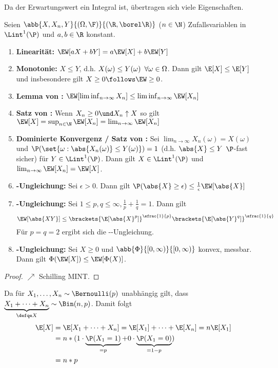 Da der Erwartungswert ein Integral ist, übertragen sich viele Eigenschaften. 
\begin{proposition}
	\label{5_6_proposition}
	Seien $\abb{X,X_n,Y}{(\Omega,\F)}{(\R, \borel\R)}$ ($n \in \N$) Zufallsvariablen in $\Lint^1(\P)$ und $a,b \in \R$ konstant.
	\begin{enumerate}[leftmargin=*]
		\item \textbf{Linearität:} $\EW[aX +bY] = a \EW[X] + b \EW[Y]$
		\item \textbf{Monotonie:} $X \le Y$, d.h. $X(\omega) \le Y(\omega) \enskip \forall \omega \in \Omega$. Dann gilt $\E[X] \le \E[Y]$ und insbesondere gilt $X \ge 0 \follows \EW \ge 0$.
		\item \textbf{Lemma von :} $\EW[\liminf_{n \to \infty}X_n] \le \liminf_{n \to \infty} \EW[X_n]$
		\item \textbf{Satz von :} Wenn $X_n \ge 0 \und X_n \uparrow X$ so gilt $\EW[X] = \sup_{n \in \N} \EW[X_n] = \lim_{n \to \infty} \EW[X_n]$
		\item \textbf{Dominierte Konvergenz / Satz von :} Sei $\lim_{n \to \infty} X_n(\omega) = X(\omega)$ und $\P(\set{\omega: \abs{X_n(\omega)} \le Y(\omega)}) = 1$ (d.h. $\abs{X} \le Y$ $\P$-fast sicher) für $Y \in \Lint^1(\P)$. Dann gilt $X \in \Lint^{1}(\P)$ und $\lim_{n \to \infty} \EW[X_n] = \EW[X]$.
		\item \textbf{-Ungleichung:} Sei $\epsilon > 0$. Dann gilt $\P(\abs{X} \ge \epsilon) \le \frac{1}{\epsilon} \EW[\abs{X}]$
		\item \textbf{-Ungleichung:} Sei $1 \le p,q \le \infty, \frac{1}{p}+ \frac{1}{q} = 1$. Dann gilt 
		\begin{equation*}
			\EW[\abs{XY}] \le \brackets{\E[\abs{X}^p]}^{\sfrac{1}{p}} \brackets{\E[\abs{Y}^q]}^{\sfrac{1}{q}}
		\end{equation*}
		Für $p = q = 2$ ergibt sich die --Ungleichung.
		\item \textbf{-Ungleichung:} Sei $X \ge 0$ und $\abb{\Phi}{[0,\infty)}{[0,\infty)}$ konvex, messbar. Dann gilt $\Phi(\EW[X]) \le \EW[\Phi(X)]$.
	\end{enumerate}
\end{proposition}
\begin{proof}
	$\nearrow$ Schilling MINT.
\end{proof}

\begin{beispiel}
	\label{5_7_beispiel}
	Da für $X_1,\dots, X_n \sim \Bernoulli(p)$ unabhängig gilt, dass $\underbrace{X_1 + \cdots + X_n}_{\defqe X} \sim \Bin(n,p)$. Damit folgt
	\begin{equation*}
	  \begin{aligned}
		  \E[X] 
		  &= \E[X_1 + \cdots + X_n] = \E[X_1] + \cdots + \E[X_n] = n \E[X_1] \\
		  &= n * (1 \cdot \underbrace{\P(X_1 = 1)}_{= p} + 0 \cdot \underbrace{\P(X_1 = 0)}_{= 1-p})\\
		  &= n * p
	  \end{aligned}
	\end{equation*}
\end{beispiel}

